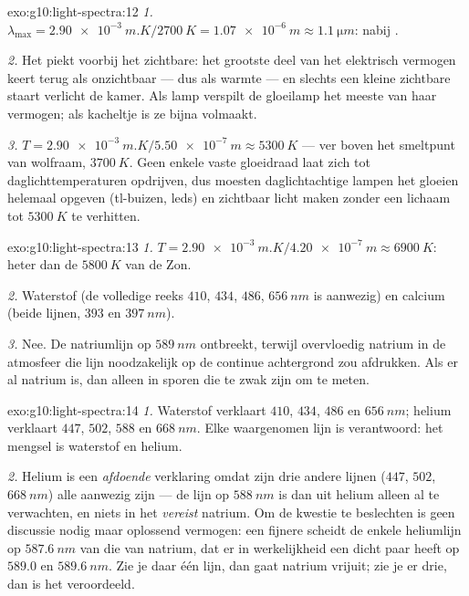 \begin{solution}{exo:g10:light-spectra:12}
\emph{1.} $\lambda_{\max} = \qty{2.90e-3}{m.K} / \qty{2700}{K}
= \qty{1.07e-6}{m} \approx \qty{1.1}{\micro m}$: nabij .

\emph{2.} Het  piekt voorbij het zichtbare: het grootste deel van
het elektrisch vermogen keert terug als onzichtbaar  --- dus als
warmte --- en slechts een kleine zichtbare staart verlicht de kamer. Als
lamp verspilt de gloeilamp het meeste van haar vermogen; als kacheltje is
ze bijna volmaakt.

\emph{3.} $T = \qty{2.90e-3}{m.K} / \qty{5.50e-7}{m} \approx
\qty{5300}{K}$ --- ver boven het smeltpunt van wolfraam,
$\qty{3700}{K}$. Geen enkele vaste gloeidraad laat zich tot
daglichttemperaturen opdrijven, dus moesten daglichtachtige lampen het
gloeien helemaal opgeven (tl-buizen, leds) en zichtbaar licht maken
zonder een lichaam tot $\qty{5300}{K}$ te verhitten.
\end{solution}

\begin{solution}{exo:g10:light-spectra:13}
\emph{1.} $T = \qty{2.90e-3}{m.K} / \qty{4.20e-7}{m} \approx
\qty{6900}{K}$: heter dan de $\qty{5800}{K}$ van de Zon.

\emph{2.} Waterstof (de volledige reeks $410$, $434$, $486$,
$\qty{656}{nm}$ is aanwezig) en calcium (beide lijnen, $393$ en
$\qty{397}{nm}$).

\emph{3.} Nee. De natriumlijn op $\qty{589}{nm}$ ontbreekt, terwijl
overvloedig natrium in de atmosfeer die lijn noodzakelijk op de continue
achtergrond zou afdrukken. Als er al natrium is, dan alleen in sporen die
te zwak zijn om te meten.
\end{solution}

\begin{solution}{exo:g10:light-spectra:14}
\emph{1.} Waterstof verklaart $410$, $434$, $486$ en $\qty{656}{nm}$;
helium verklaart $447$, $502$, $588$ en $\qty{668}{nm}$. Elke
waargenomen lijn is verantwoord: het mengsel is waterstof en helium.

\emph{2.} Helium is een \emph{afdoende} verklaring omdat zijn drie andere
lijnen ($447$, $502$, $\qty{668}{nm}$) alle aanwezig zijn --- de lijn op
$\qty{588}{nm}$ is dan uit helium alleen al te verwachten, en niets in
het  \emph{vereist} natrium. Om de kwestie te beslechten is geen
discussie nodig maar oplossend vermogen: een fijnere 
scheidt de enkele heliumlijn op $\qty{587.6}{nm}$ van die van natrium,
dat er in werkelijkheid een dicht paar heeft op $589.0$ en
$\qty{589.6}{nm}$. Zie je daar één lijn, dan gaat natrium vrijuit; zie je
er drie, dan is het veroordeeld.
\end{solution}

